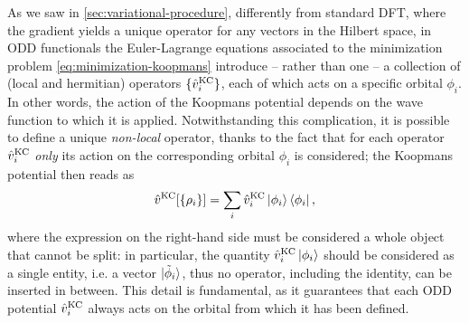 As we saw in \cref{sec:variational-procedure}, differently from standard DFT, where the gradient yields a unique operator for any vectors in the Hilbert space, in ODD functionals the Euler-Lagrange equations associated to the minimization problem \eqref{eq:minimization-koopmans} introduce -- rather than one -- a collection of (local and hermitian) operators $\{ \hat{v}_i^{\rm KC} \}$, each of which acts on a specific orbital $\phi_i$. In other words, the action of the Koopmans potential depends on the wave function to which it is applied. Notwithstanding this complication, it is possible to define a unique \emph{non-local} operator, thanks to the fact that for each operator $\hat{v}_i^{\rm KC}$ \emph{only} its action on the corresponding orbital $\phi_i$ is considered; the Koopmans potential then reads as
%
\begin{equation}
    \hat{v}^{\rm KC}[\{ \rho_i \}] = \sum_i \hat{v}^{\rm KC}_i \ket{\phi_i} \bra{\phi_i} ,
    \label{eq:koopmans-potential}
\end{equation}
%
where the expression on the right-hand side must be considered a whole object that cannot be split: in particular, the quantity $\hat{v}^{\rm KC}_i \ket{\phi_i}$ should be considered as a single entity, i.e. a vector $\ket{\Tilde{\phi}_i}$, thus no operator, including the identity, can be inserted in between. This detail is fundamental, as it guarantees that each ODD potential $\hat{v}^{\rm KC}_i$ always acts on the orbital from which it has been defined.

